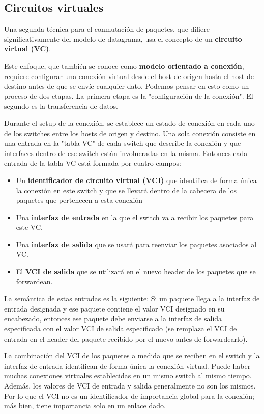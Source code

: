 \subsection{Circuitos virtuales}
Una segunda técnica para el conmutación de paquetes, que difiere significativamente del modelo de datagrama, usa el concepto de un \textbf{circuito virtual (VC)}.

Este enfoque, que también se conoce como \textbf{modelo orientado a conexión}, requiere configurar una conexión virtual desde el host de origen hasta el host de destino antes de que se envíe cualquier dato. Podemos pensar en esto como un proceso de dos etapas. La primera etapa es la "configuración de la conexión". El segundo es la transferencia de datos.

Durante el setup de la conexión, se establece un estado de conexión en cada uno de los switches entre los hosts de origen y destino. Una sola conexión consiste en una entrada en la "tabla VC" de cada switch que describe la conexión y que interfaces dentro de ese switch están involucradas en la misma. Entonces cada entrada de la tabla VC está formada por cuatro campos:

\begin{itemize}
  \item Un \textbf{identificador de circuito virtual (VCI)} que identifica de forma única la conexión en este switch y que se llevará dentro de la cabecera de los paquetes que pertenecen a esta conexión
  \item Una \textbf{interfaz de entrada} en la que el switch va a recibir los paquetes para este VC.
  \item Una \textbf{interfaz de salida} que se usará para reenviar los paquetes asociados al VC.
  \item El \textbf{VCI de salida} que se utilizará en el nuevo header de los paquetes que se forwardean.
 \end{itemize}
 
 La semántica de estas entradas es la siguiente: Si un paquete llega a la interfaz de entrada designada y ese paquete contiene el valor VCI designado en su encabezado, entonces ese paquete debe enviarse a la interfaz de salida especificada con el valor VCI de salida especificado (se remplaza el VCI de entrada en el header del paquete recibido por el nuevo antes de forwardearlo).

 La combinación del VCI de los paquetes a medida que se reciben en el switch y la interfaz de entrada identifican de forma única la conexión virtual. Puede haber muchas conexiones virtuales establecidas en un mismo switch al mismo tiempo. Además, los valores de VCI de entrada y salida generalmente no son los mismos. Por lo que el VCI no es un identificador de importancia global para la conexión; más bien, tiene importancia solo en un enlace dado.

